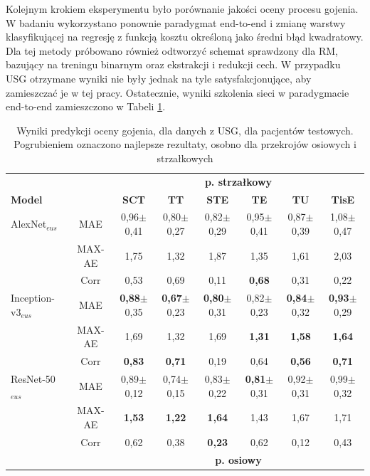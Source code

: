 Kolejnym krokiem eksperymentu było porównanie jakości oceny procesu gojenia. W badaniu wykorzystano ponownie paradygmat end-to-end i zmianę warstwy klasyfikującej na regresję z funkcją kosztu określoną jako średni błąd kwadratowy. Dla tej metody próbowano również odtworzyć schemat sprawdzony dla RM, bazujący na treningu binarnym oraz ekstrakcji i redukcji cech. W przypadku USG otrzymane wyniki nie były jednak na tyle satysfakcjonujące, aby zamieszczać je w tej pracy. Ostatecznie, wyniki szkolenia sieci w paradygmacie end-to-end zamieszczono w Tabeli \ref{tab:usg_train_cross-validation}.
\renewcommand{\arraystretch}{1.2}
\begin{table}[h]
	\scriptsize
	\setlength{\tabcolsep}{3pt}
	\centering
	\caption{Wyniki predykcji oceny gojenia, dla danych z USG, dla pacjentów testowych. Pogrubieniem oznaczono najlepsze rezultaty, osobno dla przekrojów osiowych i strzałkowych}
	\label{tab:usg_train_cross-validation}
	\begin{tabular}{lc||c|c|c|c|c|c}
		& & \multicolumn{6}{c}{\textbf{p. strzałkowy}} \\
		\textbf{Model} & & \textbf{SCT} & \textbf{TT} & \textbf{STE} & \textbf{TE} & \textbf{TU} & \textbf{TisE} \\ \hline \hline
		AlexNet$_{eus}$ & MAE & 0,96$\pm$0,41 & 0,80$\pm$0,27 & 0,82$\pm$0,29 & 0,95$\pm$0,41 & 0,87$\pm$0,39 & 1,08$\pm$0,47  \\
		& MAX-AE & 1,75 & 1,32 & 1,87 & 1,35 & 1,61 & 2,03 \\ 
		& Corr & 0,53 & 0,69 & 0,11 & \textbf{0,68} & 0,31 & 0,22 \\ \hline
		Inception-v3$_{eus}$ & MAE & \textbf{0,88}$\pm$0,35 & \textbf{0,67}$\pm$0,23 & \textbf{0,80}$\pm$0,31 & 0,82$\pm$0,23 & \textbf{0,84}$\pm$0,32 & \textbf{0,93}$\pm$0,29  \\
		& MAX-AE & 1,69 & 1,32 & 1,69 & \textbf{1,31} & \textbf{1,58} & \textbf{1,64} \\ 
		& Corr & \textbf{0,83} & \textbf{0,71} & 0,19 & 0,64 & \textbf{0,56} & \textbf{0,71} \\ \hline
		ResNet-50$_{eus}$ & MAE & 0,89$\pm$0,12 & 0,74$\pm$0,15 & 0,83$\pm$0,22 & \textbf{0,81}$\pm$0,31 & 0,92$\pm$0,31 & 0,99$\pm$0,32 \\
		& MAX-AE & \textbf{1,53} & \textbf{1,22} & \textbf{1,64} & 1,43 & 1,67 & 1,71 \\
		& Corr & 0,62 & 0,38 & \textbf{0,23} & 0,62 & 0,12 & 0,43 \\ \hline \hline
		& & \multicolumn{6}{c}{\textbf{p. osiowy}} \\
		

\end{tabular}
\end{table}
